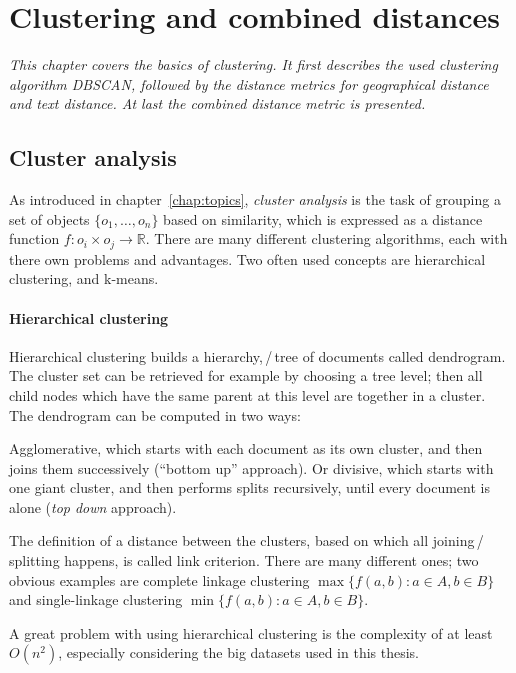 
\chapter{Clustering and combined distances}
\emph{%
This chapter covers the basics of clustering. It first describes the used clustering algorithm DBSCAN, followed by the distance metrics for geographical distance and text distance. At last the combined distance metric is presented.
}\label{chap:cluster}

\section{Cluster analysis}
As introduced in chapter~\ref{chap:topics}, \emph{cluster analysis} is the task of grouping a set of objects $\{o_1, \dots, o_n\}$ based on similarity, which is expressed as a distance function $f: o_i \times o_j \rightarrow \mathbb{R}$. There are many different clustering algorithms\cite{Berkhin2006}, each with there own problems and advantages. Two often used concepts are hierarchical clustering, and k-means.

\subsubsection*{Hierarchical clustering}
Hierarchical clustering builds a hierarchy,\,/\,tree of documents called dendrogram. The cluster set can be retrieved for example by choosing a tree level; then all child nodes which have the same parent at this level are together in a cluster. The dendrogram can be computed in two ways: 
    
Agglomerative, which starts with each document as its own cluster, and then joins them successively (\enquote{bottom up} approach). Or divisive, which starts with one giant cluster, and then performs splits recursively, until every document is alone (\emph{top down} approach).

The definition of a distance between the clusters, based on which all joining\,/\,splitting happens, is called link criterion. There are many different ones; two obvious examples are complete linkage clustering $\max \{f(a,b): a \in A, b \in B\}$ and single-linkage clustering $\min \{f(a,b): a \in A, b \in B\}$. 

A great problem with using hierarchical clustering is the complexity of at least $O(n^2)$, especially considering the big datasets used in this thesis.

